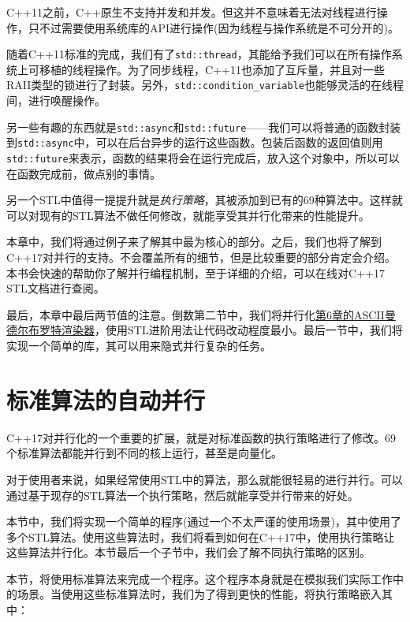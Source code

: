 C++11之前，C++原生不支持并发和并发。但这并不意味着无法对线程进行操作，只不过需要使用系统库的API进行操作(因为线程与操作系统是不可分开的)。

随着C++11标准的完成，我们有了\texttt{std::thread}，其能给予我们可以在所有操作系统上可移植的线程操作。为了同步线程，C++11也添加了互斥量，并且对一些RAII类型的锁进行了封装。另外，\texttt{std::condition\_variable}也能够灵活的在线程间，进行唤醒操作。

另一些有趣的东西就是\texttt{std::async}和\texttt{std::future}——我们可以将普通的函数封装到\texttt{std::async}中，可以在后台异步的运行这些函数。包装后函数的返回值则用\texttt{std::future}来表示，函数的结果将会在运行完成后，放入这个对象中，所以可以在函数完成前，做点别的事情。

另一个STL中值得一提提升就是\emph{执行策略}，其被添加到已有的69种算法中。这样就可以对现有的STL算法不做任何修改，就能享受其并行化带来的性能提升。

本章中，我们将通过例子来了解其中最为核心的部分。之后，我们也将了解到C++17对并行的支持。不会覆盖所有的细节，但是比较重要的部分肯定会介绍。本书会快速的帮助你了解并行编程机制，至于详细的介绍，可以在线对C++17 STL文档进行查阅。

最后，本章中最后两节值的注意。倒数第二节中，我们将并行化\href{content/chapter6/chapter6-5-chinese.md}{第6章的ASCII曼德尔布罗特渲染器}，使用STL进阶用法让代码改动程度最小。最后一节中，我们将实现一个简单的库，其可以用来隐式并行复杂的任务。


\section{标准算法的自动并行}

C++17对并行化的一个重要的扩展，就是对标准函数的执行策略进行了修改。69个标准算法都能并行到不同的核上运行，甚至是向量化。

对于使用者来说，如果经常使用STL中的算法，那么就能很轻易的进行并行。可以通过基于现存的STL算法一个执行策略，然后就能享受并行带来的好处。

本节中，我们将实现一个简单的程序(通过一个不太严谨的使用场景)，其中使用了多个STL算法。使用这些算法时，我们将看到如何在C++17中，使用执行策略让这些算法并行化。本节最后一个子节中，我们会了解不同执行策略的区别。


本节，将使用标准算法来完成一个程序。这个程序本身就是在模拟我们实际工作中的场景。当使用这些标准算法时，我们为了得到更快的性能，将执行策略嵌入其中：

